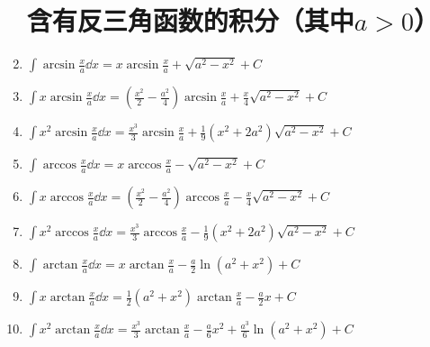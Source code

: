 \begin{enumerate}
\section*{含有反三角函数的积分\texorpdfstring{（其中\(a>0\)）}{}}
\item \(\int \arcsin\frac{x}{a} \dd{x}
= x \arcsin\frac{x}{a} + \sqrt{a^2-x^2} + C\)
\item \(\int x \arcsin\frac{x}{a} \dd{x}
= \left(\frac{x^2}{2}-\frac{a^2}{4}\right) \arcsin\frac{x}{a}
+ \frac{x}{4} \sqrt{a^2-x^2} + C\)
\item \(\int x^2 \arcsin\frac{x}{a} \dd{x}
= \frac{x^3}{3} \arcsin\frac{x}{a}
+ \frac{1}{9} (x^2+2a^2) \sqrt{a^2-x^2} + C\)
\item \(\int \arccos\frac{x}{a} \dd{x}
= x \arccos\frac{x}{a} - \sqrt{a^2-x^2} + C\)
\item \(\int x \arccos\frac{x}{a} \dd{x}
= \left(\frac{x^2}{2}-\frac{a^2}{4}\right) \arccos\frac{x}{a}
- \frac{x}{4} \sqrt{a^2-x^2} + C\)
\item \(\int x^2 \arccos\frac{x}{a} \dd{x}
= \frac{x^3}{3} \arccos\frac{x}{a}
- \frac{1}{9} (x^2+2a^2) \sqrt{a^2-x^2} + C\)
\item \(\int \arctan\frac{x}{a} \dd{x}
= x \arctan\frac{x}{a} - \frac{a}{2} \ln(a^2+x^2) + C\)
\item \(\int x \arctan\frac{x}{a} \dd{x}
= \frac{1}{2} (a^2+x^2) \arctan\frac{x}{a} - \frac{a}{2} x + C\)
\item \(\int x^2 \arctan\frac{x}{a} \dd{x}
= \frac{x^3}{3} \arctan\frac{x}{a}
- \frac{a}{6} x^2 + \frac{a^3}{6} \ln(a^2+x^2) + C\)


\end{enumerate}

